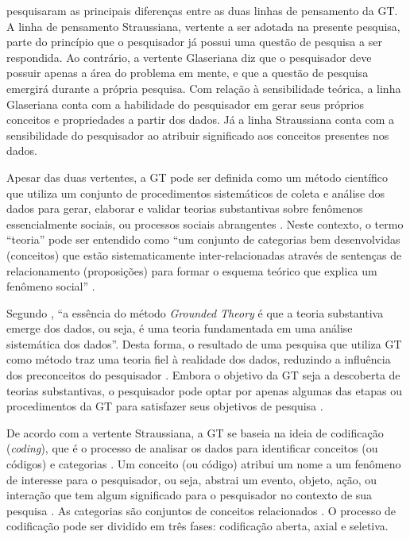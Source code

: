  pesquisaram as principais diferenças entre as duas linhas de pensamento da GT. A linha de pensamento Straussiana, vertente a ser adotada na presente pesquisa, parte do princípio que o pesquisador já possui uma questão de pesquisa a ser respondida. Ao contrário, a vertente Glaseriana diz que o pesquisador deve possuir apenas a área do problema em mente, e que a questão de pesquisa emergirá durante a própria pesquisa. Com relação à sensibilidade teórica, a linha Glaseriana conta com a habilidade do pesquisador em gerar seus próprios conceitos e propriedades a partir dos dados. Já a linha Straussiana conta com a sensibilidade do pesquisador ao atribuir significado aos conceitos presentes nos dados.

Apesar das duas vertentes, a GT pode ser definida como um método científico que utiliza um conjunto de procedimentos sistemáticos de coleta e análise dos dados para gerar, elaborar e validar teorias substantivas sobre fenômenos essencialmente sociais, ou processos sociais abrangentes \cite{bandeira:03}. Neste contexto, o termo ``teoria'' pode ser entendido como ``um conjunto de categorias bem desenvolvidas (conceitos) que estão sistematicamente inter-relacionadas através de sentenças de relacionamento (proposições) para formar o esquema teórico que explica um fenômeno social'' \cite[p. 22]{corbin:98}.

Segundo , ``a essência do método \textit{Grounded Theory} é que a teoria substantiva emerge dos dados, ou seja, é uma teoria fundamentada em uma análise sistemática dos dados''. Desta forma, o resultado de uma pesquisa que utiliza GT como método traz uma teoria fiel à realidade dos dados, reduzindo a influência dos preconceitos do pesquisador \cite{bandeira:03}. Embora o objetivo da GT seja a descoberta de teorias substantivas, o pesquisador pode optar por apenas algumas das etapas ou procedimentos da GT para satisfazer seus objetivos de pesquisa \cite{corbin:98}.

De acordo com a vertente Straussiana, a GT se baseia na ideia de codificação (\textit{coding}), que é o processo de analisar os dados para identificar conceitos (ou códigos) e categorias \cite{conte:09}. Um conceito (ou código) atribui um nome a um fenômeno de interesse para o pesquisador, ou seja, abstrai um evento, objeto, ação, ou interação que tem algum significado para o pesquisador no contexto de sua pesquisa \cite{corbin:98}. As categorias são conjuntos de conceitos relacionados \cite{birks:11}. O processo de codificação pode ser dividido em três fases: codificação aberta, axial e seletiva.
 
